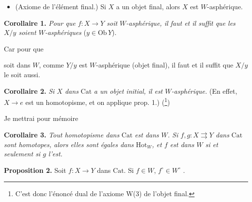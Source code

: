 \documentclass[11pt]{article}
\newcommand{\Cat}{\mathrm{Cat}}
\newcommand{\fl}{\longrightarrow}
\newcommand{\Ob}{\mathrm{Ob}\,}
\newcommand{\Hot}{\mathrm{Hot}}
\begin{document}
\begin{itemize}[leftmargin=*]
\item[\textbf{W(3)}] (Axiome de l'élément final.) Si $X$ a un objet final, alors $X$ est $W$-asphérique.
\end{itemize}

\textbf{Corollaire 1.} \textit{Pour que $f : X \fl Y$ soit $W$-asphérique, il faut et il suffit que les $X/y$ soient $W$-asphériques} ($y \in \Ob Y$).

Car pour que
soit dans $W$, comme $Y/y$ est $W$-asphérique (objet final), il faut et il suffit que $X/y$ le soit aussi.

\textbf{Corollaire 2.} \textit{Si $X$ dans} $\Cat$ \textit{a un objet initial, il est $W$-asphérique.} (En effet, $X \fl e$ est un homotopisme, et on applique prop. 1.) (\footnote{C'est donc l'énoncé dual de l'axiome W(3) de l'objet final.})

Je mettrai pour mémoire

\textbf{Corollaire 3.} \textit{Tout homotopisme dans} $\Cat$ \textit{est dans $W$. Si $f, g : X \rightrightarrows Y$ dans} $\Cat$ \textit{sont homotopes, alors elles sont égales dans} $\Hot_W$\textit{, et $f$ est dans $W$ si et seulement si $g$ l'est.}

\textbf{Proposition 2.} Soit $f : X \fl Y$ dans $\Cat$. Si $f \in W$, $f^\circ \in W^\circ$ .
\end{document}
